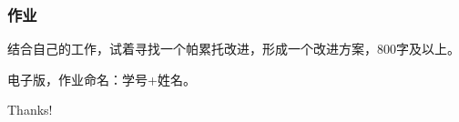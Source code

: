 \documentclass[aspectratio=169, 12pt]{beamer}
\begin{document}
\begin{frame}[plain]
    \frametitle{作业}
    结合自己的工作，试着寻找一个帕累托改进，形成一个改进方案，800字及以上。
    \par
    电子版，作业命名：学号+姓名。
\end{frame}

\begin{frame}[standout]
    \begin{center}
        {\Huge\calligra Thanks!}
    \end{center}
\end{frame}
\end{document}
